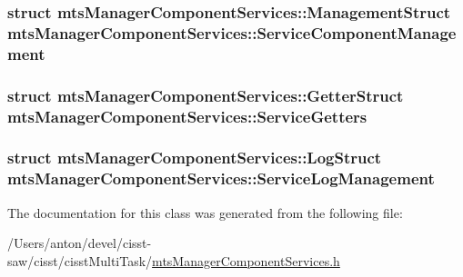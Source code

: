 \subsubsection[{Service\+Component\+Management}]{\setlength{\rightskip}{0pt plus 5cm}struct {\bf mts\+Manager\+Component\+Services\+::\+Management\+Struct}  mts\+Manager\+Component\+Services\+::\+Service\+Component\+Management\hspace{0.3cm}{\ttfamily [protected]}}\label{classmts_manager_component_services_afa9127a7692a729340f2eb537e3d1f43}
\hypertarget{classmts_manager_component_services_aa2830971a51549f362b28011511b177f}{}
\subsubsection[{Service\+Getters}]{\setlength{\rightskip}{0pt plus 5cm}struct {\bf mts\+Manager\+Component\+Services\+::\+Getter\+Struct}  mts\+Manager\+Component\+Services\+::\+Service\+Getters\hspace{0.3cm}{\ttfamily [protected]}}\label{classmts_manager_component_services_aa2830971a51549f362b28011511b177f}
\hypertarget{classmts_manager_component_services_a521a825f8142d5b44abf696abab1f8ef}{}
\subsubsection[{Service\+Log\+Management}]{\setlength{\rightskip}{0pt plus 5cm}struct {\bf mts\+Manager\+Component\+Services\+::\+Log\+Struct}  mts\+Manager\+Component\+Services\+::\+Service\+Log\+Management\hspace{0.3cm}{\ttfamily [protected]}}\label{classmts_manager_component_services_a521a825f8142d5b44abf696abab1f8ef}


The documentation for this class was generated from the following file\+:\begin{DoxyCompactItemize}
\item 
/\+Users/anton/devel/cisst-\/saw/cisst/cisst\+Multi\+Task/\hyperlink{mts_manager_component_services_8h}{mts\+Manager\+Component\+Services.\+h}\end{DoxyCompactItemize}
